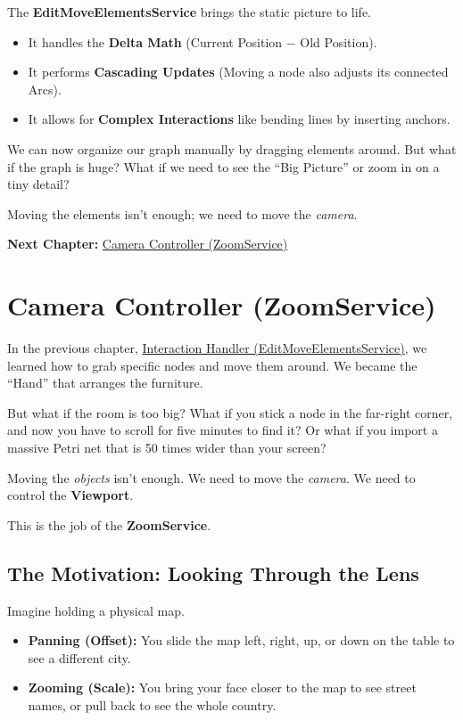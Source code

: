 \documentclass[a4paper,11pt,oneside]{report}
\begin{document}
The \textbf{EditMoveElementsService} brings the static picture to life.
\begin{itemize}
    \item It handles the \textbf{Delta Math} (Current Position $-$ Old Position).
    \item It performs \textbf{Cascading Updates} (Moving a node also adjusts its connected Arcs).
    \item It allows for \textbf{Complex Interactions} like bending lines by inserting anchors.
\end{itemize}

We can now organize our graph manually by dragging elements around. But what if the graph is huge? What if we need to see the ``Big Picture'' or zoom in on a tiny detail?

Moving the elements isn't enough; we need to move the \emph{camera}.

\textbf{Next Chapter:} \hyperref[chap:zoom]{Camera Controller (ZoomService)}

\chapter{Camera Controller (ZoomService)}
\label{chap:zoom}

In the previous chapter, \hyperref[chap:interaction]{Interaction Handler (EditMoveElementsService)}, we learned how to grab specific nodes and move them around. We became the ``Hand'' that arranges the furniture.

But what if the room is too big? What if you stick a node in the far-right corner, and now you have to scroll for five minutes to find it? Or what if you import a massive Petri net that is 50 times wider than your screen?

Moving the \emph{objects} isn't enough. We need to move the \emph{camera}. We need to control the \textbf{Viewport}.

This is the job of the \textbf{ZoomService}.

\section{The Motivation: Looking Through the Lens}

Imagine holding a physical map.
\begin{itemize}
    \item \textbf{Panning (Offset):} You slide the map left, right, up, or down on the table to see a different city.
    \item \textbf{Zooming (Scale):} You bring your face closer to the map to see street names, or pull back to see the whole country.
\end{itemize}
\end{document}
